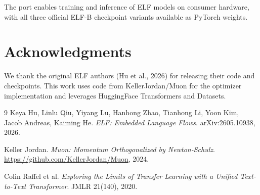 \documentclass[11pt]{article}
\begin{document}
The port enables training and inference of ELF models on consumer hardware,
with all three official ELF-B checkpoint variants available as PyTorch weights.

\section*{Acknowledgments}

We thank the original ELF authors (Hu et al., 2026) for releasing their code and
checkpoints. This work uses code from KellerJordan/Muon for the optimizer implementation
and leverages HuggingFace Transformers and Datasets.

\begin{thebibliography}{9}
Keya Hu, Linlu Qiu, Yiyang Lu, Hanhong Zhao, Tianhong Li, Yoon Kim, Jacob Andreas,
Kaiming He. \textit{ELF: Embedded Language Flows}. arXiv:2605.10938, 2026.

Keller Jordan. \textit{Muon: Momentum Orthogonalized by Newton-Schulz}.
\url{https://github.com/KellerJordan/Muon}, 2024.

Colin Raffel et al. \textit{Exploring the Limits of Transfer Learning with a Unified
Text-to-Text Transformer}. JMLR 21(140), 2020.
\end{thebibliography}
\end{document}
